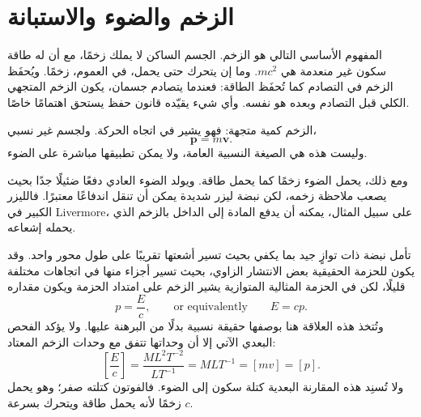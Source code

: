 \begin{classroomqa}
\end{classroomqa}

\begin{classroomqa}
\end{classroomqa}

\section{الزخم والضوء والاستبانة}

المفهوم الأساسي التالي هو الزخم. الجسم الساكن لا يملك زخمًا، مع أن له طاقة سكون غير منعدمة هي \(mc^2\). وما إن يتحرك حتى يحمل، في العموم، زخمًا. ويُحفَظ الزخم في التصادم كما تُحفَظ الطاقة: فعندما يتصادم جسمان، يكون الزخم المتجهي الكلي قبل التصادم وبعده هو نفسه. وأي شيء يقيّده قانون حفظ يستحق اهتمامًا خاصًا.

الزخم كمية متجهة: فهو يشير في اتجاه الحركة. ولجسم غير نسبي،
\begin{equation}
\mathbf p=m\mathbf v.
\end{equation}
وليست هذه هي الصيغة النسبية العامة، ولا يمكن تطبيقها مباشرة على الضوء.

ومع ذلك، يحمل الضوء زخمًا كما يحمل طاقة. ويولد الضوء العادي دفعًا ضئيلًا جدًا بحيث يصعب ملاحظة زخمه، لكن نبضة ليزر شديدة يمكن أن تنقل اندفاعًا معتبرًا. فالليزر الكبير في Livermore، على سبيل المثال، يمكنه أن يدفع المادة إلى الداخل بالزخم الذي يحمله إشعاعه.

تأمل نبضة ذات توازٍ جيد بما يكفي بحيث تسير أشعتها تقريبًا على طول محور واحد. وقد يكون للحزمة الحقيقية بعض الانتشار الزاوي، بحيث تسير أجزاء منها في اتجاهات مختلفة قليلًا، لكن في الحزمة المثالية المتوازية يشير الزخم على امتداد الحزمة ويكون مقداره
\begin{equation}
p=\frac{E}{c},
\qquad\text{or equivalently}\qquad
E=cp.
\end{equation}
وتُتخذ هذه العلاقة هنا بوصفها حقيقة نسبية بدلًا من البرهنة عليها. ولا يؤكد الفحص البعدي الآتي إلا أن وحداتها تتفق مع وحدات الزخم المعتاد:
\begin{equation}
\left[\frac{E}{c}\right]
=
\frac{M L^2 T^{-2}}{L T^{-1}}
=
M L T^{-1}
=
[m v]
=
[p].
\end{equation}
ولا تُسنِد هذه المقارنة البعدية كتلة سكون إلى الضوء. فالفوتون كتلته صفر؛ وهو يحمل زخمًا لأنه يحمل طاقة ويتحرك بسرعة \(c\).

